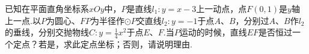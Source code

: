 \documentclass[10pt]{article}
\begin{document}
已知在平面直角坐标系$xOy$中，$P$是直线$l_1:y=x-3$上一动点，点$F(0,1)$是$y$轴上一点.以$P$为圆心、$FP$为半径作$\odot P$交直线$l_2:y=-1$于点$A$、$B$，分别过$A$、$B$作$l_2$的垂线，分别交抛物线$C:y=\frac{1}{4}x^2$于点$E$、$F$.当$P$运动的时候，直线$EF$是否恒过一个定点？若是，求此定点坐标；否则，请说明理由.
\end{document}
